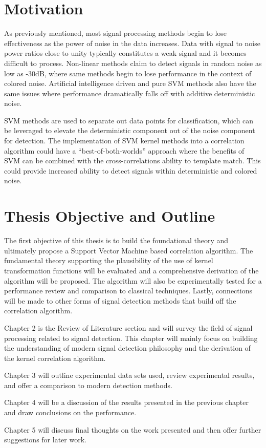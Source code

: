     
    \section{Motivation} \label{se:motivation}
        As previously mentioned, most signal processing methods begin to lose effectiveness as the power of noise in the data increases. Data with signal to noise power ratios close to unity typically constitutes a weak signal and it becomes difficult to process. Non-linear methods claim to detect signals in random noise as low as -30dB, where same methods begin to lose performance in the context of colored noise. Artificial intelligence driven and pure SVM methods also have the same issues where performance dramatically falls off with additive deterministic noise. 
        
        SVM methods are used to separate out data points for classification, which can be leveraged to elevate the deterministic component out of the noise component for detection. The implementation of SVM kernel methods into a correlation algorithm could have a “best-of-both-worlds” approach where the benefits of SVM can be combined with the cross-correlations ability to template match. This could provide increased ability to detect signals within deterministic and colored noise.

    \section{Thesis Objective and Outline} \label{se:objective_outline}
        The first objective of this thesis is to build the foundational theory and ultimately propose a Support Vector Machine based correlation algorithm. The fundamental theory supporting the plausibility of the use of kernel transformation functions will be evaluated and a comprehensive derivation of the algorithm will be proposed. The algorithm will also be experimentally tested for a performance review and comparison to classical techniques. Lastly, connections will be made to other forms of signal detection methods that build off the correlation algorithm. 

        Chapter 2 is the Review of Literature section and will survey the field of signal processing related to signal detection. This chapter will mainly focus on building the understanding of modern signal detection philosophy and the derivation of the kernel correlation algorithm. 
        
        Chapter 3 will outline experimental data sets used, review experimental results, and offer a comparison to modern detection methods.
        
        Chapter 4 will be a discussion of the results presented in the previous chapter and draw conclusions on the performance. 
        
        Chapter 5 will discuss final thoughts on the work presented and then offer further suggestions for later work.